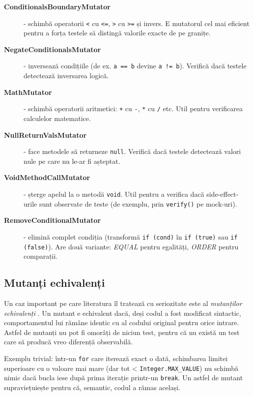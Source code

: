 \begin{description}
    \item[\textbf{ConditionalsBoundaryMutator}] - schimbă operatorii \texttt{<} cu \texttt{<=}, \texttt{>} cu \texttt{>=} și invers. E mutatorul cel mai eficient pentru a forța testele să distingă valorile exacte de pe granițe.

    \item[\textbf{NegateConditionalsMutator}] - inversează condițiile (de ex. \texttt{a == b} devine \texttt{a != b}). Verifică dacă testele detectează inversarea logică.

    \item[\textbf{MathMutator}] - schimbă operatorii aritmetici: \texttt{+} cu \texttt{-}, \texttt{*} cu \texttt{/} etc. Util pentru verificarea calculelor matematice.

    \item[\textbf{NullReturnValsMutator}] - face metodele să returneze \texttt{null}. Verifică dacă testele detectează valori nule pe care nu le-ar fi așteptat.

    \item[\textbf{VoidMethodCallMutator}] - șterge apelul la o metodă \texttt{void}. Util pentru a verifica dacă side-effect-urile sunt observate de teste (de exemplu, prin \texttt{verify()} pe mock-uri).

    \item[\textbf{RemoveConditionalMutator}] - elimină complet condiția (transformă \texttt{if (cond)} în \texttt{if (true)} sau \texttt{if (false)}). Are două variante: \textit{EQUAL} pentru egalități, \textit{ORDER} pentru comparații.
\end{description}

\subsection{Mutanți echivalenți}

Un caz important pe care literatura îl tratează cu seriozitate este al \textit{mutanților echivalenți} \cite{papadakis2019}. Un mutant e echivalent dacă, deși codul a fost modificat sintactic, comportamentul lui rămâne identic cu al codului original pentru orice intrare. Astfel de mutanți nu pot fi omorâți de niciun test, pentru că nu există un test care să producă vreo diferență observabilă.

Exemplu trivial: într-un \texttt{for} care iterează exact o dată, schimbarea limitei superioare cu o valoare mai mare (dar tot < \texttt{Integer.MAX\_VALUE}) nu schimbă nimic dacă bucla iese după prima iterație printr-un \texttt{break}. Un astfel de mutant supraviețuiește pentru că, semantic, codul a rămas același.

